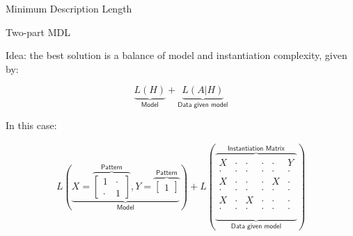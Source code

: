 \documentclass[11pt]{beamer}
\begin{document}

\begin{frame}{Minimum Description Length}
\end{frame}


\begin{frame}{Two-part MDL}

Idea: the best solution is a balance of model and instantiation complexity, given by:

$$
\underbrace{L(H)}_{\textsf{Model}} + \underbrace{L(A|H)}_{\textsf{Data given model}}
$$

In this case:

\begin{align*}
L\left(
\underbrace{
X=\overbrace{
\begin{bmatrix}
1 & \cdot \\[-.2em]
\cdot & 1
\end{bmatrix}}^{\textsf{Pattern}},
Y=\overbrace{
\begin{bmatrix}
1
\end{bmatrix}}^{\textsf{Pattern}}
}_{\textsf{Model}}
\right)
+
L\left(
\underbrace{ 
\overbrace{
\begin{matrix}
X & \cdot & \cdot & \cdot & \cdot & Y  \\[-.2em]
\cdot & \cdot & \cdot & \cdot & \cdot & \cdot  \\[-.2em]
X & \cdot & \cdot & \cdot & X & \cdot  \\[-.2em]
\cdot & \cdot & \cdot & \cdot & \cdot & \cdot  \\[-.2em]
X & \cdot & X & \cdot & \cdot & \cdot  \\[-.2em]
\cdot & \cdot & \cdot & \cdot & \cdot & \cdot  \\
\end{matrix}}}^{\textsf{Instantiation Matrix}}_{\textsf{Data given model}}
\right)
\end{align*}
\end{frame}

\end{document}
